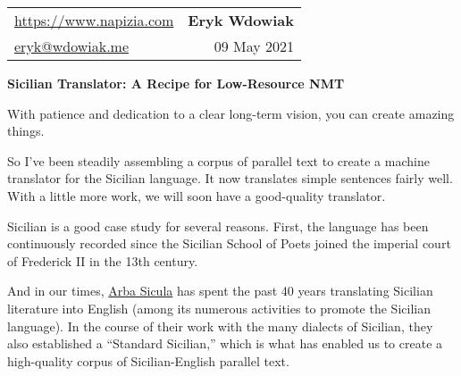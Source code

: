 \documentclass[10pt,letterpaper]{article}
\begin{document}

\thispagestyle{empty}

\hypertarget{intro}{}


\begin{tabularx}{\textwidth}{X r}
  \href{https://www.napizia.com}{https://www.napizia.com}    &  \large{\textbf{Eryk Wdowiak}}\\
  \href{mailto:eryk@wdowiak.me}{eryk@wdowiak.me}  &  09 May 2021
\end{tabularx}


\begin{center}
  \Large{\textbf{Sicilian Translator: %
  A Recipe for Low-Resource NMT}}
\end{center}



With patience and dedication to a clear long-term vision, you can create amazing things.

So I've been steadily assembling a corpus of parallel text to create a machine translator for the Sicilian language. 
It now translates simple sentences fairly well. With a little more work, we will soon have a good-quality translator.

Sicilian is a good case study for several reasons. First, the language has been continuously recorded since the 
Sicilian School of Poets joined the imperial court of Frederick II in the 13th century.

And in our times, \href{https://www.arbasicula.org/}{Arba Sicula}
has spent the past 40 years translating Sicilian literature into English
(among its numerous activities to promote the Sicilian language).
In the course of their work with the many dialects of Sicilian, they also established a ``Standard Sicilian,''
which is what has enabled us to create a high-quality corpus of Sicilian-English parallel text.
\end{document}
